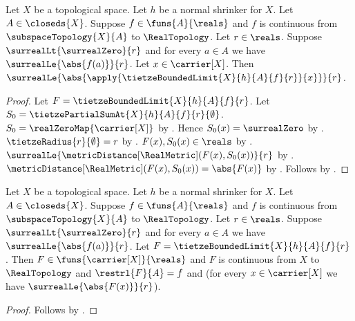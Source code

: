 \begin{theorem}\label{tietze_bounded_limit_bound}
    Let $X$ be a topological space.
    Let $h$ be a normal shrinker for $X$.
    Let $A\in\closeds{X}$.
    Suppose $f\in\funs{A}{\reals}$ and $f$ is continuous from
        $\subspaceTopology{X}{A}$ to $\RealTopology$.
    Let $r\in\reals$.
    Suppose $\surrealLt{\surrealZero}{r}$ and
        for every $a\in A$ we have $\surrealLe{\abs{f(a)}}{r}$.
    Let $x\in\carrier[X]$.
    Then
        $\surrealLe{\abs{
            \apply{\tietzeBoundedLimit{X}{h}{A}{f}{r}}{x}}}{r}$.
\end{theorem}
\begin{proof}
    Let $F=\tietzeBoundedLimit{X}{h}{A}{f}{r}$.
    Let $S_0=\tietzePartialSumAt{X}{h}{A}{f}{r}{\emptyset}$.
    $S_0=\realZeroMap{\carrier[X]}$
        by .
    Hence $S_0(x)=\surrealZero$ by .
    $\tietzeRadius{r}{\emptyset}=r$ by .
    $F(x),S_0(x)\in\reals$
        by
        .
    $\surrealLe{\metricDistance[\RealMetric](F(x),S_0(x))}{r}$
        by .
    $\metricDistance[\RealMetric](F(x),S_0(x))=\abs{F(x)}$
        by
        .
    Follows by \auto.
\end{proof}

\begin{theorem}\label{tietze_positive_bounded_extension_from_normal_shrinker}
    Let $X$ be a topological space.
    Let $h$ be a normal shrinker for $X$.
    Let $A\in\closeds{X}$.
    Suppose $f\in\funs{A}{\reals}$ and $f$ is continuous from
        $\subspaceTopology{X}{A}$ to $\RealTopology$.
    Let $r\in\reals$.
    Suppose $\surrealLt{\surrealZero}{r}$ and
        for every $a\in A$ we have $\surrealLe{\abs{f(a)}}{r}$.
    Let $F=\tietzeBoundedLimit{X}{h}{A}{f}{r}$.
    Then $F\in\funs{\carrier[X]}{\reals}$ and
        $F$ is continuous from $X$ to $\RealTopology$ and
        $\restrl{F}{A}=f$ and
        (for every $x\in\carrier[X]$ we have
            $\surrealLe{\abs{F(x)}}{r}$).
\end{theorem}
\begin{proof}
    Follows by
        .
\end{proof}

